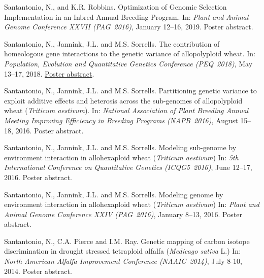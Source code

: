 \documentclass[10pt]{article}
\begin{document}
\begin{bibenum}
    \item Santantonio, N., and K.R. Robbins. Optimization of Genomic Selection Implementation in an Inbred Annual Breeding Program. In: \emph{Plant and Animal Genome Conference XXVII (PAG~2016)}, January 12--16, 2019. Poster abstract.

    \item Santantonio, N., Jannink, J.L. and M.S. Sorrells. The contribution of homeologous gene interactions to the genetic variance of allopolyploid wheat. In: \emph{Population, Evolution and Quantitative Genetics Conference (PEQ~2018)}, May 13--17, 2018. \href{http://conferences.genetics-gsa.org/peqg/2018/pdf/2018PEQGFullAbstracts.pdf} {Poster abstract}.

    \item Santantonio, N., Jannink, J.L. and M.S. Sorrells. Partitioning genetic variance to exploit additive effects and heterosis across the sub-genomes of allopolyploid wheat (\emph{Triticum aestivum}). In: \emph{National Association of Plant Breeding Annual Meeting Improving Efficiency in Breeding Programs (NAPB~2016)}, August 15--18, 2016. Poster abstract.

	\item Santantonio, N., Jannink, J.L. and M.S. Sorrells. Modeling sub-genome by environment interaction in allohexaploid wheat (\emph{Triticum aestivum}) In: \emph{5th International Conference on Quantitative Genetics  (ICQG5~2016)}, June 12--17, 2016. Poster abstract.

	\item Santantonio, N., Jannink, J.L. and M.S. Sorrells. Modeling genome by environment interaction in allohexaploid wheat (\emph{Triticum aestivum}) In: \emph{Plant and Animal Genome Conference  XXIV (PAG~2016)}, January 8--13, 2016. Poster abstract.

	\item  Santantonio, N., C.A. Pierce and  I.M. Ray. Genetic mapping of carbon isotope discrimination in drought stressed tetraploid alfalfa (\emph{Medicago sativa} L.) In: \emph{North American Alfalfa Improvement Conference (NAAIC~2014)}, July 8-10, 2014. Poster abstract.

\end{bibenum}
\end{document}
